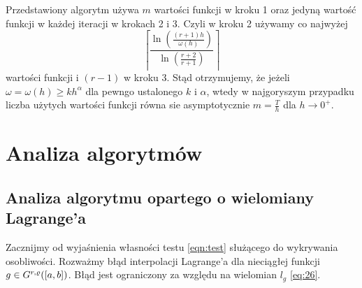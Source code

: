 \documentclass[oik, pdftex, robocza, man]{mgrwms}
\begin{document}
    Przedstawiony algorytm używa $m$ wartości funkcji w kroku 1 oraz jedyną wartość funkcji w każdej iteracji w krokach 2 i 3. Czyli w kroku 2 używamy co najwyżej
    \begin{equation*}
        \left\lceil\frac{\ln \left(\frac{(r+1) h}{\omega(h)}\right)}{\ln \left(\frac{r+2}{r+1}\right)}\right\rceil
    \end{equation*}
    wartości funkcji i $(r-1)$ w kroku 3.
    Stąd otrzymujemy, że jeżeli $\omega = \omega(h) \geq kh^{\alpha}$ dla pewngo ustalonego $k$ i $\alpha$, wtedy w najgoryszym przypadku liczba użytych wartości funkcji równa sie asymptotycznie $m = \frac{T}{h}$ dla $h \rightarrow 0^{+}$.


\mgrclosechapter


\chapter{Analiza algorytmów} \label{rozdzial_analiza_alg}


\section{Analiza algorytmu opartego o wielomiany Lagrange'a}


    Zacznijmy od wyjaśnienia własności testu \eqref{eqn:test} służącego do wykrywania osobliwości. Rozważmy błąd interpolacji Lagrange'a dla nieciągłej funkcji $g \in G^{r,\varrho}([a,b])$. Błąd jest ograniczony za względu na wielomian $l_{g}$ \eqref{eq:26}.
\end{document}
